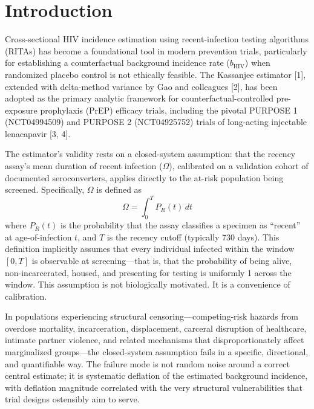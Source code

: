 \documentclass[12pt]{article}
\begin{document}
\newpage


\section{Introduction}

Cross-sectional HIV incidence estimation using recent-infection testing algorithms (RITAs) has become a foundational tool in modern prevention trials, particularly for establishing a counterfactual background incidence rate ($b_{\mathrm{HIV}}$) when randomized placebo control is not ethically feasible. The Kassanjee estimator [1], extended with delta-method variance by Gao and colleagues [2], has been adopted as the primary analytic framework for counterfactual-controlled pre-exposure prophylaxis (PrEP) efficacy trials, including the pivotal PURPOSE 1 (NCT04994509) and PURPOSE 2 (NCT04925752) trials of long-acting injectable lenacapavir [3, 4].

The estimator's validity rests on a closed-system assumption: that the recency assay's mean duration of recent infection ($\Omega$), calibrated on a validation cohort of documented seroconverters, applies directly to the at-risk population being screened. Specifically, $\Omega$ is defined as
\begin{equation}
\Omega = \int_0^T P_R(t)\, dt
\end{equation}
where $P_R(t)$ is the probability that the assay classifies a specimen as ``recent'' at age-of-infection $t$, and $T$ is the recency cutoff (typically 730 days). This definition implicitly assumes that every individual infected within the window $[0, T]$ is observable at screening---that is, that the probability of being alive, non-incarcerated, housed, and presenting for testing is uniformly 1 across the window. This assumption is not biologically motivated. It is a convenience of calibration.

In populations experiencing structural censoring---competing-risk hazards from overdose mortality, incarceration, displacement, carceral disruption of healthcare, intimate partner violence, and related mechanisms that disproportionately affect marginalized groups---the closed-system assumption fails in a specific, directional, and quantifiable way. The failure mode is not random noise around a correct central estimate; it is systematic deflation of the estimated background incidence, with deflation magnitude correlated with the very structural vulnerabilities that trial designs ostensibly aim to serve.
\end{document}
